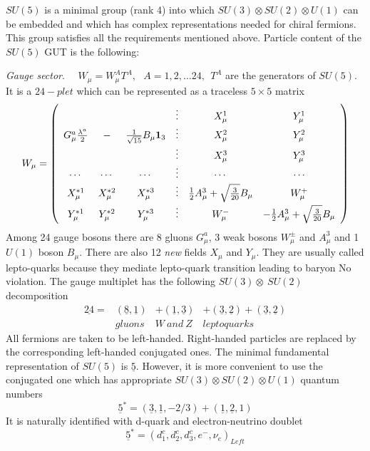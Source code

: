 \documentclass{cernyrep}
\begin{document}
$SU(5)$ is a minimal group (rank 4) into which $SU(3) \otimes
 SU(2) \otimes U(1)$ can be embedded and which has complex
representations needed for chiral fermions. This group
satisfies all the requirements mentioned above. 
Particle content of the $SU(5)$ GUT is the following:

{\em Gauge sector}. \ \ $W_{\mu} = W_{\mu}^A T^A, \ \ \ A = 1,2, \ldots
 24 , \ \ T^A $ are the generators of $SU(5)$. It is a $24-plet$
which can be represented as a traceless $5 \times 5$ matrix
$$ W_{\mu} = \left ( \begin{array}{cccccc}
 &  &  & \vdots & X_{\mu}^1 & Y_{\mu}^1 \\
G_{\mu}^a \frac{\lambda^a}{2} & - & \frac{1}{\sqrt{15}}B_{\mu}
 {\bf 1}_3 & \vdots & X_{\mu}^2 & Y_{\mu}^2  \\
 &  &  & \vdots & X_{\mu}^3 & Y_{\mu}^3 \\
\cdots & \cdots & \cdots & \vdots & \cdots & \cdots \\
X_{\mu}^{*1} & X_{\mu}^{*2} & X_{\mu}^{*3} & \vdots & \frac{1}{2}
A_{\mu}^3 + \sqrt{\frac{3}{20}}B_{\mu} & W_{\mu}^+ \\
Y_{\mu}^{*1} & Y_{\mu}^{*2} & Y_{\mu}^{*3} & \vdots & W_{\mu}^- &
 - \frac{1}{2}A_{\mu}^3 + \sqrt{\frac{3}{20}}B_{\mu}  \end{array}
 \right ) $$
Among 24 gauge bosons there are 8 gluons $G_{\mu}^a$, 3 weak bosons
$W_{\mu}^{\pm}$ and $A_{\mu}^3$ and 1 $U(1)$ boson $B_{\mu}$. There
 are also 12 {\em new} fields $X_{\mu}$ and $Y_{\mu}$. They are usually called
 lepto-quarks because they mediate lepto-quark transition
leading to baryon No violation. The gauge multiplet has the
following $SU(3) \otimes \ SU(2)$ decomposition
$$\begin{array}{cccc} \underline {24} = & (\underline 8 , \underline 1 )
 & + ( \underline 1 , \underline 3 ) & + ( \underline 3 , \underline 2 )
 + ( \underline 3 , \underline 2 ) \\
 & gluons & W \ and \ Z & leptoquarks \end{array}$$
All fermions are taken to be left-handed.
 Right-handed particles are replaced by the corresponding left-handed
conjugated ones. The minimal fundamental representation of $SU(5)$ is
 $\underline 5$. However, it is more convenient to use the conjugated
one which has appropriate $SU(3) \otimes SU(2) \otimes U(1)$
quantum numbers
$$\underline 5^* = (\underline 3 , \underline 1 , -2/3 ) + (
\underline 1 , \underline 2 ,1) $$
It is naturally identified with d-quark and electron-neutrino
 doublet
$$\underline 5^* = (d_1^c , d_2^c , d_3^c , e^- , \nu_e )_{Left} $$
\end{document}
